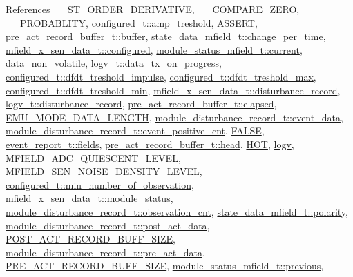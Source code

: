References \hyperlink{a00021_source_l00030}{\+\_\+\+\_\+S\+T\+\_\+\+O\+R\+D\+E\+R\+\_\+\+D\+E\+R\+I\+V\+A\+T\+I\+V\+E}, \hyperlink{a00021_source_l00027}{\+\_\+\+\_\+\+C\+O\+M\+P\+A\+R\+E\+\_\+\+Z\+E\+R\+O}, \hyperlink{a00021_source_l00033}{\+\_\+\+\_\+\+P\+R\+O\+B\+A\+B\+L\+I\+T\+Y}, \hyperlink{a00021_a4b3bbfb0267daea1432f2603825ade62}{configured\+\_\+t\+::amp\+\_\+treshold}, \hyperlink{a00072_source_l00059}{A\+S\+S\+E\+R\+T}, \hyperlink{a00022_source_l00137}{pre\+\_\+act\+\_\+record\+\_\+buffer\+\_\+t\+::buffer}, \hyperlink{a00019_source_l00102}{state\+\_\+data\+\_\+mfield\+\_\+t\+::change\+\_\+per\+\_\+time}, \hyperlink{a00025_source_l00036}{mfield\+\_\+x\+\_\+sen\+\_\+data\+\_\+t\+::configured}, \hyperlink{a00019_source_l00108}{module\+\_\+status\+\_\+mfield\+\_\+t\+::current}, \hyperlink{a00060_source_l00016}{data\+\_\+non\+\_\+volatile}, \hyperlink{a00021_a6cdefde69642ef511e3252c38be68516}{logv\+\_\+t\+::data\+\_\+tx\+\_\+on\+\_\+progress}, \hyperlink{a00021_source_l00189}{configured\+\_\+t\+::dfdt\+\_\+treshold\+\_\+impulse}, \hyperlink{a00021_source_l00190}{configured\+\_\+t\+::dfdt\+\_\+treshold\+\_\+max}, \hyperlink{a00021_source_l00191}{configured\+\_\+t\+::dfdt\+\_\+treshold\+\_\+min}, \hyperlink{a00025_source_l00041}{mfield\+\_\+x\+\_\+sen\+\_\+data\+\_\+t\+::disturbance\+\_\+record}, \hyperlink{a00021_a11ed024c2cc5c53c79b2c0a8b35e3c06}{logv\+\_\+t\+::disturbance\+\_\+record}, \hyperlink{a00022_source_l00140}{pre\+\_\+act\+\_\+record\+\_\+buffer\+\_\+t\+::elapsed}, \hyperlink{a00022_source_l00015}{E\+M\+U\+\_\+\+M\+O\+D\+E\+\_\+\+D\+A\+T\+A\+\_\+\+L\+E\+N\+G\+T\+H}, \hyperlink{a00022_source_l00228}{module\+\_\+disturbance\+\_\+record\+\_\+t\+::event\+\_\+data}, \hyperlink{a00022_source_l00182}{module\+\_\+disturbance\+\_\+record\+\_\+t\+::event\+\_\+positive\+\_\+cnt}, \hyperlink{a00040_source_l00086}{F\+A\+L\+S\+E}, \hyperlink{a00021_a5296d090c085b0421fdf5a86e382abea}{event\+\_\+report\+\_\+t\+::fields}, \hyperlink{a00022_source_l00142}{pre\+\_\+act\+\_\+record\+\_\+buffer\+\_\+t\+::head}, \hyperlink{a00021_source_l00153}{H\+O\+T}, \hyperlink{a00038_source_l00036}{logv}, \hyperlink{a00019_source_l00029}{M\+F\+I\+E\+L\+D\+\_\+\+A\+D\+C\+\_\+\+Q\+U\+I\+E\+S\+C\+E\+N\+T\+\_\+\+L\+E\+V\+E\+L}, \hyperlink{a00019_source_l00031}{M\+F\+I\+E\+L\+D\+\_\+\+S\+E\+N\+\_\+\+N\+O\+I\+S\+E\+\_\+\+D\+E\+N\+S\+I\+T\+Y\+\_\+\+L\+E\+V\+E\+L}, \hyperlink{a00021_source_l00200}{configured\+\_\+t\+::min\+\_\+number\+\_\+of\+\_\+observation}, \hyperlink{a00025_source_l00045}{mfield\+\_\+x\+\_\+sen\+\_\+data\+\_\+t\+::module\+\_\+status}, \hyperlink{a00022_source_l00180}{module\+\_\+disturbance\+\_\+record\+\_\+t\+::observation\+\_\+cnt}, \hyperlink{a00019_source_l00104}{state\+\_\+data\+\_\+mfield\+\_\+t\+::polarity}, \hyperlink{a00022_source_l00177}{module\+\_\+disturbance\+\_\+record\+\_\+t\+::post\+\_\+act\+\_\+data}, \hyperlink{a00022_source_l00014}{P\+O\+S\+T\+\_\+\+A\+C\+T\+\_\+\+R\+E\+C\+O\+R\+D\+\_\+\+B\+U\+F\+F\+\_\+\+S\+I\+Z\+E}, \hyperlink{a00022_source_l00176}{module\+\_\+disturbance\+\_\+record\+\_\+t\+::pre\+\_\+act\+\_\+data}, \hyperlink{a00022_source_l00013}{P\+R\+E\+\_\+\+A\+C\+T\+\_\+\+R\+E\+C\+O\+R\+D\+\_\+\+B\+U\+F\+F\+\_\+\+S\+I\+Z\+E}, \hyperlink{a00019_source_l00110}{module\+\_\+status\+\_\+mfield\+\_\+t\+::previous}, 